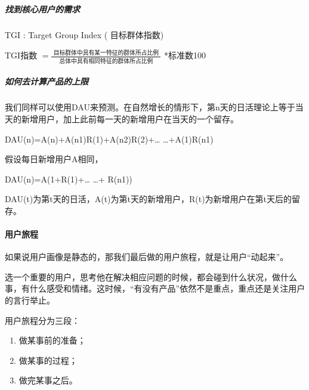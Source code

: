 \documentclass[letterpaper,10pt,english]{sphinxmanual}
\begin{document}
\subparagraph{找到核心用户的需求}
\label{\detokenize{chapter_knowledge/users_analysis:id15}}
TGI : Target Group Index ( 目标群体指数)

TGI指数
\(=\frac{\text { 目标群体中具有某一特征的群体所占比例 }}{\text { 总体中具有相同特征的群体所占比例 }}\)
*标准数100


\subparagraph{如何去计算产品的上限}
\label{\detokenize{chapter_knowledge/users_analysis:id16}}
我们同样可以使用DAU来预测。在自然增长的情形下，第n天的日活理论上等于当天的新增用户，加上此前每一天的新增用户在当天的一个留存。

DAU(n)=A(n)+A(n\sphinxhyphen{}1)R(1)+A(n\sphinxhyphen{}2)R(2)+… …+A(1)R(n\sphinxhyphen{}1)

假设每日新增用户A相同，

DAU(n)=A(1+R(1)+… …+ R(n\sphinxhyphen{}1))

DAU(t)为第t天的日活，A(t)为第t天的新增用户，R(t)为新增用户在第t天后的留存。


\paragraph{用户旅程}
\label{\detokenize{chapter_knowledge/users_analysis:id17}}
如果说用户画像是静态的，那我们最后做的用户旅程，就是让用户“动起来”。

选一个重要的用户，思考他在解决相应问题的时候，都会碰到什么状况，做什么事，有什么感受和情绪。这时候，“有没有产品”依然不是重点，重点还是关注用户的言行举止。

用户旅程分为三段：
\begin{enumerate}
%
\item {} 
做某事前的准备；

\item {} 
做某事的过程；

\item {} 
做完某事之后。

\end{enumerate}
\end{document}
